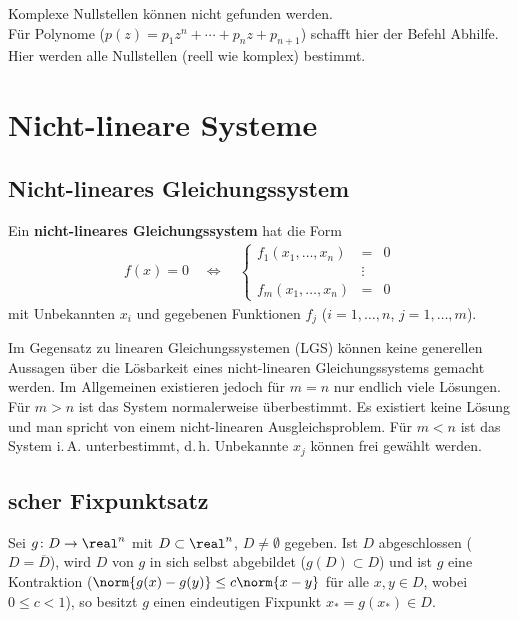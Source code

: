 Komplexe Nullstellen können nicht gefunden werden. \\
Für Polynome  ($p(z) = p_1 z^n + \dotsb + p_n z + p_{n+1}$)
schafft hier der Befehl  Abhilfe.
Hier werden alle Nullstellen (reell wie komplex) bestimmt.

\pagebreak

\section{%
    Nicht-lineare Systeme%
}

\subsection{%
    Nicht-lineares Gleichungssystem%
}

Ein \textbf{nicht-lineares Gleichungssystem} hat die Form
\begin{align*}
    f(x) = 0 \quad\Leftrightarrow\quad
    \left\{\begin{array}{rcl}
        f_1(x_1, \dotsc, x_n) & = & 0 \\
        & \vdots \\
        f_m(x_1, \dotsc, x_n) & = & 0
    \end{array}\right.
\end{align*}
mit Unbekannten $x_i$ und gegebenen Funktionen $f_j$ ($i = 1, \dotsc, n$,
$j = 1, \dotsc, m$).

Im Gegensatz zu linearen Gleichungssystemen (LGS) können keine generellen
Aussagen über die Lösbarkeit eines nicht-linearen Gleichungssystems gemacht
werden.
Im Allgemeinen existieren jedoch für $m = n$ nur endlich viele Lösungen.
Für $m > n$ ist das System normalerweise überbestimmt.
Es existiert keine Lösung und man spricht von einem
nicht-linearen Ausgleichsproblem.
Für $m < n$ ist das System i.\,A. unterbestimmt,
d.\,h. Unbekannte $x_j$ können frei gewählt werden.

\subsection{%
    scher Fixpunktsatz%
}

Sei $g\colon D \rightarrow \real^n$ mit $D \subset \real^n$,
$D \not= \emptyset$ gegeben.
Ist $D$ abgeschlossen ($D = \overline{D}$),
wird $D$ von $g$ in sich selbst abgebildet ($g(D) \subset D$)
und ist $g$ eine Kontraktion ($\norm{g(x) - g(y)} \le c \norm{x - y}$
für alle $x, y \in D$, wobei $0 \le c < 1$),
so besitzt $g$ einen eindeutigen Fixpunkt $x_\ast = g(x_\ast) \in D$.

